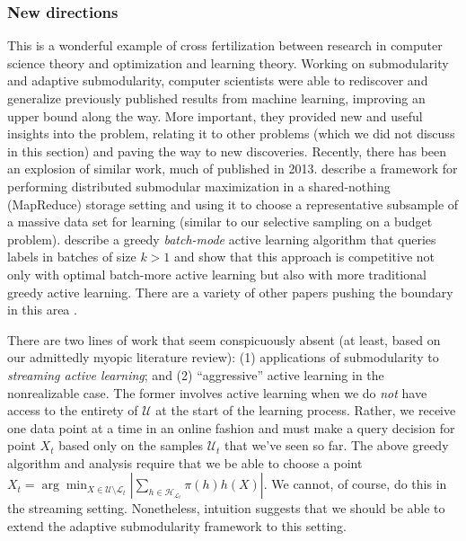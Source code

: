 \subsubsection{New directions}

\noindent This is a wonderful example of cross fertilization between research in computer science theory and optimization and learning theory. Working on submodularity and adaptive submodularity, computer scientists were able to rediscover and generalize previously published results from machine learning, improving an upper bound along the way. More important, they provided new and useful insights into the problem, relating it to other problems (which we did not discuss in this section) and paving the way to new discoveries. Recently, there has been an explosion of similar work, much of published in 2013. \cite{mirzasoleiman13distributed} describe a framework for performing distributed submodular maximization in a shared-nothing (MapReduce) storage setting and using it to choose a representative subsample of a massive data set for learning (similar to our selective sampling on a budget problem). \cite{chen13near} describe a greedy \textit{batch-mode} active learning algorithm that queries labels in batches of size $k > 1$ and show that this approach is competitive not only with optimal batch-more active learning but also with more traditional greedy active learning. There are a variety of other papers pushing the boundary in this area \cite{GolovinK11} \cite{golovin10near} \cite{zuluaga13active} \cite{hollinger:2011}.

There are two lines of work that seem conspicuously absent (at least, based on our admittedly myopic literature review): (1) applications of submodularity to \textit{streaming active learning}; and (2) ``aggressive'' active learning in the nonrealizable case. The former involves active learning when we do \textit{not} have access to the entirety of $\mathcal{U}$ at the start of the learning process. Rather, we receive one data point at a time in an online fashion and must make a query decision for point $X_t$ based only on the samples $\mathcal{U}_t$ that we've seen so far. The above greedy algorithm and analysis require that we be able to choose a point $X_t = \arg\min_{X \in \mathcal{U} \setminus \mathcal{L}_t} \left| \sum_{h \in \mathcal{H}_{\mathcal{L}_t}} \pi(h) h(X) \right|$. We cannot, of course, do this in the streaming setting. Nonetheless, intuition suggests that we should be able to extend the adaptive submodularity framework to this setting.

